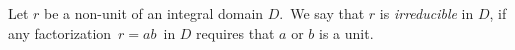 \documentclass{article}
\begin{document}
Let $r$ be a non-unit of an integral domain $D$. \,We say that $r$ is \emph{irreducible} in $D$, if any factorization \,$r = ab$\, in $D$ requires that $a$ or $b$ is a unit.
\end{document}
